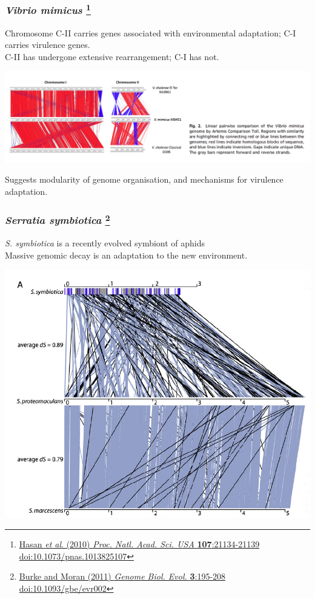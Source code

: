 \begin{frame}
  \frametitle{\textit{Vibrio mimicus} \footnote{\tiny{\href{http://dx.doi.org/10.1073/pnas.1013825107}{Hasan \textit{et al}. (2010) \textit{Proc. Natl. Acad. Sci. USA} \textbf{107}:21134-21139 doi:10.1073/pnas.1013825107}}}}
  Chromosome C-II carries genes associated with environmental adaptation; C-I carries virulence genes.\\
  C-II has undergone extensive rearrangement; C-I has not.\\
  \begin{center}
    \includegraphics[width=1\textwidth]{images/v_mimicus}
  \end{center}    
  Suggests modularity of genome organisation, and mechanisms for virulence adaptation.
\end{frame}

\begin{frame}
  \frametitle{\textit{Serratia symbiotica} \footnote{\tiny{\href{http://dx.doi.org/10.1093/gbe/evr002}{Burke and Moran (2011) \textit{Genome Biol. Evol.} \textbf{3}:195-208 doi:10.1093/gbe/evr002}}}}
  \textit{S. symbiotica} is a recently evolved symbiont of aphids\\
  Massive genomic decay is an adaptation to the new environment.\\
  \begin{center}
    \includegraphics[width=0.75\textheight]{images/s_symbiotica}
  \end{center}    
\end{frame}

